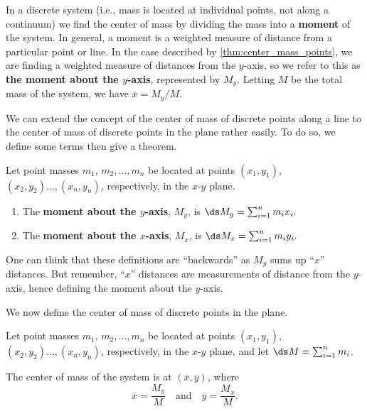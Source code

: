 In a discrete system (i.e., mass is located at individual points, not along a continuum) we find the center of mass by dividing the mass into a \textbf{moment} of the system. In general, a moment is a weighted measure of distance from a particular point or line. In the case described by \autoref{thm:center_mass_points}, we are finding a weighted measure of distances from the $y$-axis, so we refer to this as \textbf{the moment about the $y$-axis}, represented by $M_y$.  Letting $M$ be the total mass of the system, we have  $\overline{x} = M_y/M$. 

We can extend the concept of the center of mass of discrete points along a line to the center of mass of discrete points in the plane rather easily. To do so, we define some terms then give a theorem.

{Let point masses $m_1$, $m_2,\ldots,m_n$ be located at points $(x_1,y_1)$, $(x_2,y_2)\ldots,(x_n,y_n)$, respectively, in the $x$-$y$ plane. 
\begin{enumerate}
	\item The \textbf{moment about the $y$-axis}, $M_y$, is 
	$\ds M_y = \sum_{i=1}^n m_ix_i.$
	\item The \textbf{moment about the $x$-axis}, $M_x$, is 
	$\ds M_x = \sum_{i=1}^n m_iy_i.$
	\end{enumerate}
}

One can think that these definitions are ``backwards'' as $M_y$ sums up ``$x$'' distances. But remember, ``$x$'' distances are measurements of distance from the $y$-axis, hence defining the moment about the $y$-axis.

We now define the center of mass of discrete points in the plane.

{Let point masses $m_1$, $m_2,\ldots,m_n$ be located at points $(x_1,y_1)$, $(x_2,y_2)\ldots,(x_n,y_n)$, respectively, in the $x$-$y$ plane, and let $\ds M = \sum_{i=1}^n m_i$.  

The center of mass of the system is at $(\overline{x},\overline{y})$, where 
\[\overline{x}= \frac{M_y}{M}\quad \text{and}\quad \overline{y} = \frac{M_x}{M}.\]}

